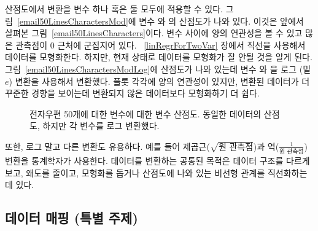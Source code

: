 산점도에서 변환을 변수 하나 혹은 둘 모두에 적용할 수 있다.
그림~\ref{email50LinesCharactersMod}에 변수  와 의 산점도가 나와 있다. 이것은 앞에서 살펴본 그림~\ref{email50LinesCharacters}이다. 변수 사이에 양의 연관성을 볼 수 있고 많은 관측점이 0 근처에 군집지어 있다. ~\ref{linRegrForTwoVar} 장에서 직선을 사용해서 데이터를 모형화한다.
하지만, 현재 상태로 데이터를 모형화가 잘 안될 것을 알게 된다. 
그림~\ref{email50LinesCharactersModLog}에 산점도가 나와 있는데 변수  와 을 로그 (밑 $e$) 변환을 사용해서 변환했다.
플롯 각각에 양의 연관성이 있지만, 변환된 데이터가 더 꾸준한 경향을 보이는데 변환되지 않은 데이터보다 모형화하기 더 쉽다.

\begin{figure}
\centering
{}
\caption{ 전자우편 50개에 대한  변수에 대한  변수 산점도.  동일한 데이터의 산점도, 하지만 각 변수를 로그 변환했다.}
\label{email50LinesCharactersModMain}
\end{figure}

또한, 로그 말고 다른 변환도 유용하다. 예를 들어 제곱근($\sqrt{\text{원 관측점}}$)과 역($\frac{1}{\text{원 관측점}}$) 변환을 통계학자가 사용한다. 데이터를 변환하는 공통된 목적은 데이터 구조를 다르게 보고, 왜도를 줄이고, 모형화를 돕거나 산점도에 나와 있는 비선형 관계를 직선화하는데 있다.


\subsection{데이터 매핑 (특별 주제)}


